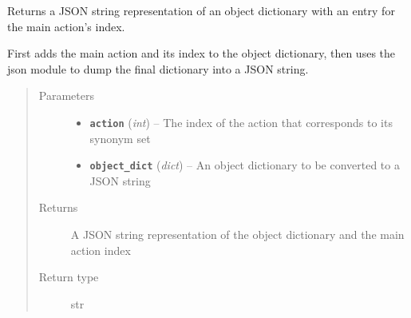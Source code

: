 \documentclass[letterpaper,10pt,english]{sphinxmanual}
\begin{document}

\begin{fulllineitems}
\label{interpreter:interpreter.interpreter.generate_json}
Returns a JSON string representation of an object dictionary with an entry for the main action's index.

First adds the main action and its index to the object dictionary, then uses the json module to dump the final dictionary into a JSON string.
\begin{quote}\begin{description}
\item[{Parameters}] \leavevmode\begin{itemize}
\item {} 
\textbf{\texttt{action}} (\emph{int}) -- The index of the action that corresponds to its synonym set

\item {} 
\textbf{\texttt{object\_dict}} (\emph{dict}) -- An object dictionary to be converted to a JSON string

\end{itemize}

\item[{Returns}] \leavevmode
A JSON string representation of the object dictionary and the main action index

\item[{Return type}] \leavevmode
str

\end{description}\end{quote}

\end{fulllineitems}

\end{document}
